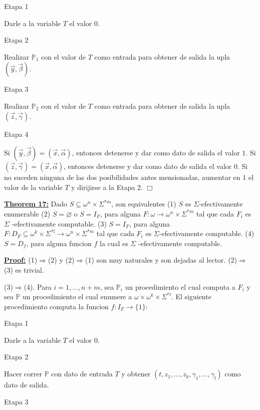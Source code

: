 Etapa 1

Darle a la variable \(T\) el valor \(0\).

Etapa 2

Realizar \(\mathbb{P}_{1}\) con el valor de \(T\) como entrada para obtener de salida la upla \((\vec{y},\vec{\beta})\).

Etapa 3

Realizar \(\mathbb{P}_{2}\) con el valor de \(T\) como entrada para obtener de salida la upla \((\vec{z},\vec{\gamma})\).

Etapa 4

Si \((\vec{y},\vec{\beta})=(\vec{x},\vec{\alpha})\), entonces detenerse y dar como dato de salida el valor \(1\). Si \((\vec{z},\vec{\gamma} )=(\vec{x},\vec{\alpha})\), entonces detenerse y dar como dato de salida el valor \(0.\) Si no suceden ninguna de las dos posibilidades antes mensionadas, aumentar en \(1\) el valor de la variable \(T\) y dirijirse a la Etapa 2. \(\Box\)

  \textbf{\underline{Theorem 17:}} Dado \(S\subseteq \omega ^{n}\times \Sigma ^{\ast m}\), son equivalentes
(1) \(S\) es \(\Sigma \)-efectivamente enumerable
(2) \(S=\varnothing \) o \(S=I_{F}\), para alguna \(F:\omega \rightarrow \omega ^{n}\times \Sigma ^{\ast m}\) tal que cada \(F_{i}\) es \(\Sigma \) -efectivamente computable.
(3) \(S=I_{F}\), para alguna \(F:D_{F}\subseteq \omega ^{k}\times \Sigma ^{\ast l}\rightarrow \omega ^{n}\times \Sigma ^{\ast m}\) tal que cada \(F_{i}\) es \(\Sigma \)-efectivamente computable.
(4) \(S=D_{f}\), para alguna funcion \(f\) la cual es \(\Sigma \) -efectivamente computable.

  \textbf{\underline{Proof:}} (1)\(\Rightarrow \)(2) y (2)\(\Rightarrow \)(1) son muy naturales y son dejadas al lector. (2)\(\Rightarrow \)(3) es trivial.

(3)\(\Rightarrow \)(4). Para \(i=1,...,n+m\), sea \(\mathbb{P}_{i}\) un procedimiento el cual computa a \(F_{i}\) y sea \(\mathbb{P}\) un procedimiento el cual enumere a \(\omega \times \omega ^{k}\times \Sigma ^{\ast l}.\) El siguiente procedimiento computa la funcion \(f:I_{F}\rightarrow \{1\}\):

Etapa 1

Darle a la variable \(T\) el valor 0.

Etapa 2

Hacer correr \(\mathbb{P}\) con dato de entrada \(T\) y obtener \( (t,z_{1},...,z_{k},\gamma _{1},...,\gamma _{l})\) como dato de salida.

Etapa 3

